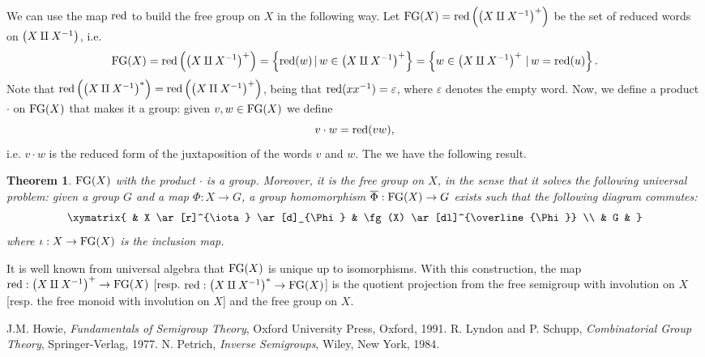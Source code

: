 \documentclass[12pt]{article}
\newtheorem{thm}{Theorem}
\begin{document}
We can use the map $\mathrm{red}$ to build the free group on $X$ in the following way. Let $\mathrm{FG}(X)=\mathrm{red}\left( \left( X\amalg X^{-1} \right)^+ \right)$ be the set of reduced words on $\left( X\amalg X^{-1} \right)$, i.e. $$\mathrm{FG}(X)=\mathrm{red}\left( \left( X\amalg X^{-1} \right)^+ \right)=\left\{ \mathrm{red}(w)\,|\,w\in\left( X\amalg X^{-1} \right)^+ \right\}=\left\{ w\in\left( X\amalg X^{-1} \right)^+\,|\,w=\mathrm{red}(u) \right\}.$$
Note that $\mathrm{red}\left( \left( X\amalg X^{-1} \right)^\ast \right)=\mathrm{red}\left( \left( X\amalg X^{-1} \right)^+ \right)$, being that $\mathrm{red}(xx^{-1})=\varepsilon$, where $\varepsilon$ denotes the empty word. Now, we define a product $\cdot$ on $\mathrm{FG}(X)$ that makes it a group: given $v,w\in\mathrm{FG}(X)$ we define $$v\cdot w=\mathrm{red}(vw),$$ i.e. $v\cdot w$ is the reduced form of the juxtaposition of the words $v$ and $w$. The we have the following result.
\begin{thm}
$\mathrm{FG}(X)$ with the product $\cdot$ is a group. Moreover, it is the \emph{free group} on $X$, in the sense that it solves the following universal problem: given a group  $G$ and a map $\Phi:X\rightarrow G$, a group homomorphism $\overline\Phi:\mathrm{FG}(X)\rightarrow G$ exists such that the following diagram commutes:
$$
\xymatrix{
& X \ar[r]^{\iota} \ar[d]_{\Phi} & \fg(X) \ar[dl]^{\overline{\Phi}} \\
& G &
}
$$
where $\iota:X\rightarrow \mathrm{FG}(X)$ is the inclusion map. 
\end{thm}
It is well known from universal algebra that $\mathrm{FG}(X)$ is unique up to isomorphisms. With this construction, the map $\mathrm{red}:\left( X\amalg X^{-1} \right)^+\rightarrow\mathrm{FG}(X)$ [resp. $\mathrm{red}:\left( X\amalg X^{-1} \right)^\ast\rightarrow\mathrm{FG}(X)$] is the quotient projection from 
the free semigroup with involution on $X$ [resp. the free monoid with involution on $X$] and the free group on $X$.


\begin{thebibliography}{9}
 J.M. Howie, \emph{Fundamentals of Semigroup Theory}, Oxford University Press, Oxford, 1991.
 R. Lyndon and P. Schupp, \emph{Combinatorial Group Theory}, Springer-Verlag, 1977.
 N. Petrich, \emph{Inverse Semigroups}, Wiley, New York, 1984.
\end{thebibliography}
 



\end{document}
